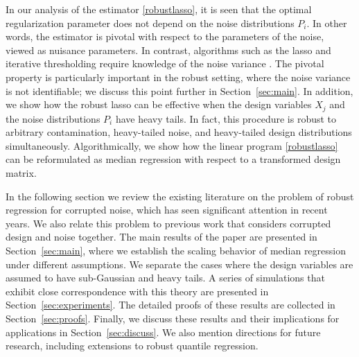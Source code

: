 In our analysis of the estimator \eqref{robustlasso}, it is seen that the optimal regularization parameter does not depend on the noise distributions $P_i$. In other words, the
estimator is pivotal with respect to the parameters of the noise, viewed as nuisance parameters.
In contrast, algorithms such as the lasso and iterative thresholding  require knowledge of the noise variance \citep{bickel2009simultaneous,suggala2019adaptive}.
The pivotal property is particularly important in the robust setting, where the
noise variance is not identifiable; we discuss this point further in Section~\ref{sec:main}.
In addition, we show how the robust lasso can be effective when the design variables $X_j$ and the noise distributions $P_i$ have heavy tails.
In fact, this procedure is robust to arbitrary contamination, heavy-tailed noise, and heavy-tailed design distributions simultaneously. Algorithmically, we show how the linear program \eqref{robustlasso} can be reformulated as median regression with respect to a transformed design matrix.

In the following section we review the existing literature on the problem of robust regression for corrupted noise, which has seen significant attention in recent years. We also relate this problem to previous work that considers corrupted design and noise together. The main results of the paper are presented in Section~\ref{sec:main}, where we establish the scaling behavior of median regression under different assumptions. We separate the cases where the design variables are assumed to have sub-Gaussian and heavy tails. A series of simulations that exhibit close correspondence with this theory are presented in Section~\ref{sec:experiments}. The detailed proofs of these results are collected in Section~\ref{sec:proofs}.  Finally, we discuss these results and their implications for applications in Section~\ref{sec:discuss}. We also mention directions for future research, including extensions to robust quantile regression.

